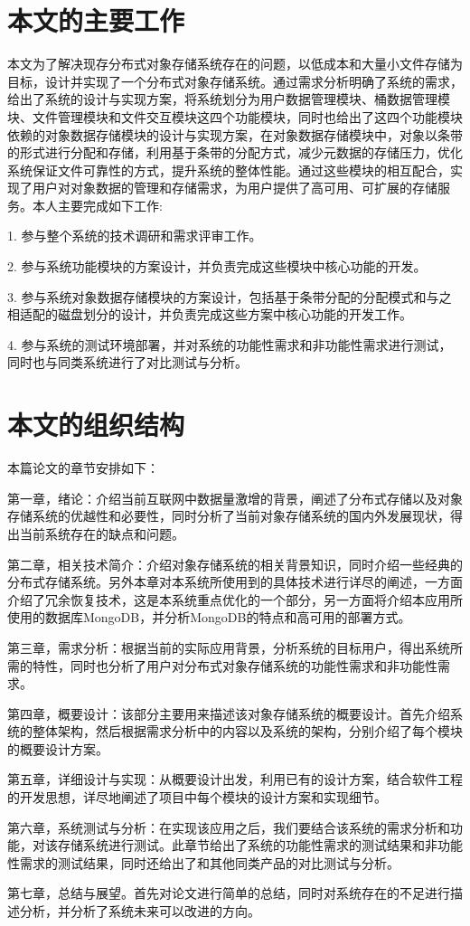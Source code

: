 \section{本文的主要工作}%
本文为了解决现存分布式对象存储系统存在的问题，以低成本和大量小文件存储为目标，设计并实现了一个分布式对象存储系统。通过需求分析明确了系统的需求，给出了系统的设计与实现方案，将系统划分为用户数据管理模块、桶数据管理模块、文件管理模块和文件交互模块这四个功能模块，同时也给出了这四个功能模块依赖的对象数据存储模块的设计与实现方案，在对象数据存储模块中，对象以条带的形式进行分配和存储，利用基于条带的分配方式，减少元数据的存储压力，优化系统保证文件可靠性的方式，提升系统的整体性能。通过这些模块的相互配合，实现了用户对对象数据的管理和存储需求，为用户提供了高可用、可扩展的存储服务。本人主要完成如下工作:

1. 参与整个系统的技术调研和需求评审工作。

2. 参与系统功能模块的方案设计，并负责完成这些模块中核心功能的开发。

3. 参与系统对象数据存储模块的方案设计，包括基于条带分配的分配模式和与之相适配的磁盘划分的设计，并负责完成这些方案中核心功能的开发工作。

4. 参与系统的测试环境部署，并对系统的功能性需求和非功能性需求进行测试，同时也与同类系统进行了对比测试与分析。

\section{本文的组织结构}%
本篇论文的章节安排如下：

第一章，绪论：介绍当前互联网中数据量激增的背景，阐述了分布式存储以及对象存储系统的优越性和必要性，同时分析了当前对象存储系统的国内外发展现状，得出当前系统存在的缺点和问题。

第二章，相关技术简介：介绍对象存储系统的相关背景知识，同时介绍一些经典的分布式存储系统。另外本章对本系统所使用到的具体技术进行详尽的阐述，一方面介绍了冗余恢复技术，这是本系统重点优化的一个部分，另一方面将介绍本应用所使用的数据库MongoDB，并分析MongoDB的特点和高可用的部署方式。 

第三章，需求分析：根据当前的实际应用背景，分析系统的目标用户，得出系统所需的特性，同时也分析了用户对分布式对象存储系统的功能性需求和非功能性需求。

第四章，概要设计：该部分主要用来描述该对象存储系统的概要设计。首先介绍系统的整体架构，然后根据需求分析中的内容以及系统的架构，分别介绍了每个模块的概要设计方案。

第五章，详细设计与实现：从概要设计出发，利用已有的设计方案，结合软件工程的开发思想，详尽地阐述了项目中每个模块的设计方案和实现细节。

第六章，系统测试与分析：在实现该应用之后，我们要结合该系统的需求分析和功能，对该存储系统进行测试。此章节给出了系统的功能性需求的测试结果和非功能性需求的测试结果，同时还给出了和其他同类产品的对比测试与分析。

第七章，总结与展望。首先对论文进行简单的总结，同时对系统存在的不足进行描述分析，并分析了系统未来可以改进的方向。
